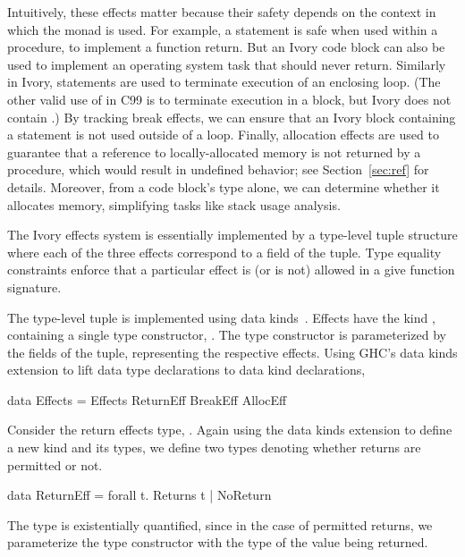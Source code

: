 Intuitively, these effects matter because their safety depends on the context in
which the monad is used. For example, a  statement is safe when used
within a procedure, to implement a function return. But an Ivory code block can
also be used to implement an operating system task that should never
return. Similarly in Ivory,  statements are used to terminate
execution of an enclosing loop. (The other valid use of  in C99 is to
terminate execution in a  block, but Ivory does not contain
.) By tracking break effects, we can ensure that an Ivory block
containing a  statement is not used outside of a loop. Finally,
allocation effects are used to guarantee that a reference to locally-allocated
memory is not returned by a procedure, which would result in undefined behavior; see
Section~\ref{sec:ref} for details. Moreover, from a code block's type alone, we
can determine whether it allocates memory, simplifying tasks like stack usage
analysis.

The Ivory effects system is essentially implemented by a type-level tuple
structure where each of the three effects correspond to a field of the
tuple. Type equality constraints enforce that a particular effect is (or is not)
allowed in a give function signature.

The type-level tuple is implemented using data kinds~\cite{data-kinds}. Effects have the
kind , containing a single type constructor, . The type
constructor  is parameterized by the fields of the tuple,
representing the respective effects. Using GHC's data kinds extension to lift
data type declarations to data kind declarations,
\begin{code}
data Effects = Effects ReturnEff BreakEff AllocEff
\end{code}

\noindent
Consider the return effects type, .  Again using the data kinds
extension to define a new kind and its types, we define two types denoting
whether returns are permitted or not.

\begin{code}
data ReturnEff = forall t. Returns t | NoReturn
\end{code}

\noindent
The type is existentially quantified, since in the case of permitted returns, we
parameterize the type constructor with the type of the value being returned.

